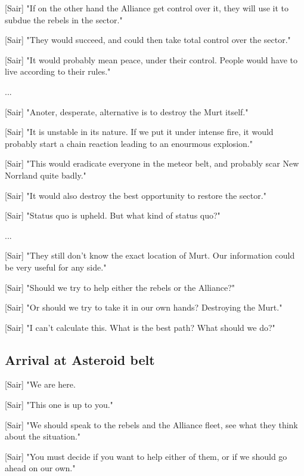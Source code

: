 \documentclass[a4paper,12pt]{article}
\begin{document}
[Sair] "If on the other hand the Alliance get control over it, they will use it to subdue the rebels in the sector."

[Sair] "They would succeed, and could then take total control over the sector." 

[Sair] "It would probably mean peace, under their control. People would have to live according to their rules."

...

[Sair] "Anoter, desperate, alternative is to destroy the Murt itself."

[Sair] "It is unstable in its nature. If we put it under intense fire, 
it would probably start a chain reaction leading to an enourmous explosion."

[Sair] "This would eradicate everyone in the meteor belt, and probably scar New Norrland quite badly."

[Sair] "It would also destroy the best opportunity to restore the sector."

[Sair] "Status quo is upheld. But what kind of status quo?"

...

[Sair] "They still don't know the exact location of Murt. Our information could be very
useful for any side."

[Sair] "Should we try to help either the rebels or the Alliance?"

[Sair] "Or should we try to take it in our own hands? Destroying the Murt."

[Sair] "I can't calculate this. What is the best path? What should we do?"


\subsection{Arrival at Asteroid belt}

[Sair] "We are here. 

[Sair] "This one is up to you." 

[Sair] "We should speak to the rebels and the Alliance fleet, see what they think about the
situation."

[Sair] "You must decide if you want to help either of them, or if we should go ahead on our own."
\end{document}
